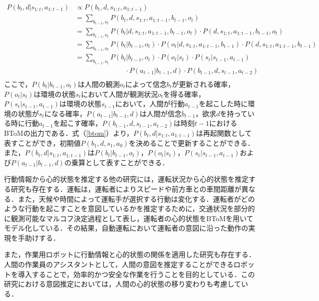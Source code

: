 \begin{equation}
  \begin{split}
  \label{btom}
  P(b_t,d|s_{1:t},a_{1:t-1}) &\propto P(b_t,d,s_{1:t},a_{1:t-1})\\
  &= \sum_{b_{t-1},o_t}P(b_t,d,s_{1:t},a_{1:t-1},b_{t-1},o_t)\\
  &= \sum_{b_{t-1},o_t}P(b_t|d,s_{1:t},a_{1:t-1},b_{t-1},o_t)\cdot P(d,s_{1:t},a_{1:t-1},b_{t-1},o_t)\\
  &= \sum_{b_{t-1},o_t}P(b_t|b_{t-1},o_t)\cdot P(o_t|d,s_{1:t},a_{1:t-1},b_{t-1})\cdot P(d,s_{1:t},a_{1:t-1},b_{t-1})\\
  &= \sum_{b_{t-1},o_t}P(b_t|b_{t-1},o_t)\cdot P(o_t|s_t)\cdot P(s_t|s_{t-1},a_{t-1})\\
  &\hspace{3cm} \cdot P(a_{t-1}|b_{t-1},d)\cdot P(b_{t-1},d,s_{t-1},a_{t-2})\\
  \end{split}
\end{equation}
ここで，$P(b_t|b_{t-1},o_t)$は人間の観測$o_t$によって信念$b_t$が更新される確率，$P(o_t|s_t)$は環境の状態$s_t$において人間が観測状況$o_t$を得る確率，$P(s_t|s_{t-1},a_{t-1})$は環境の状態$s_{t-1}$において，人間が行動$a_{t-1}$を起こした時に環境の状態が$s_t$になる確率，$P(a_{t-1}|b_{t-1},d)$は人間が信念$b_{t-1}$，欲求$d$を持っている時に行動$a_{t-1}$を起こす確率，$P(b_{t-1},d,s_{t-1},a_{t-2})$は時刻$t-1$におけるBToMの出力である．式（\ref{btom}）より，$P(b_t,d|s_{1:t},a_{1:t-1})$は再起関数として表すことができ，初期値$P(b_1,d,s_1,a_0)$を決めることで更新することができる．また，$P(b_t,d|s_{1:t},a_{1:t-1})$は$P(b_t|b_{t-1},o_t)$，$P(o_t|s_t)$，$P(s_t|s_{t-1},a_{t-1})$および$P(a_{t-1}|b_{t-1},d)$の乗算として表すことができる．


\par
行動情報から心的状態を推定する他の研究には，運転状況から心的状態を推定する研究\cite{darwish2020learning}も存在する．運転は，運転者によりスピードや前方車との車間距離が異なる．また，天候や時間によって運転手が選択する行動は変化する．運転者がどのような行動を起こすことを意図しているかを推定するために，交通状況を部分的に観測可能なマルコフ決定過程として表し，運転者の心的状態をBToMを用いてモデル化している．その結果，自動運転において運転者の意図に沿った動作の実現を手助けする．

\par
また，作業用ロボットに行動情報と心的状態の関係を適用した研究\cite{inbook}も存在する．人間の作業員のアシスタントとして，人間の意図を推定することができるロボットを導入することで，効率的かつ安全な作業を行うことを目的としている．この研究における意図推定においては，人間の心的状態の移り変わりも考慮している．

